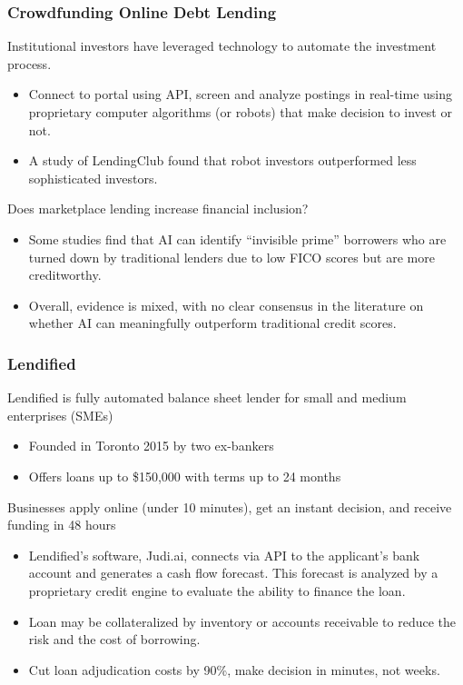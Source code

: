 \documentclass[aspectratio=169]{beamer}
\begin{document}
\begin{frame}
\frametitle{Crowdfunding Online Debt Lending}


Institutional investors have leveraged technology to automate the investment process. 
\begin{itemize}
    \item Connect to portal using API, screen and analyze postings in real-time using proprietary computer algorithms (or robots) that make decision to invest or not.
    \item A study of LendingClub found that robot investors outperformed less sophisticated investors. 
\end{itemize}

\medskip 

Does marketplace lending increase financial inclusion?
\begin{itemize}
    \item Some studies find that AI can identify “invisible prime” borrowers who are turned down by traditional lenders due to low FICO scores but are more creditworthy. 
    \item Overall, evidence is mixed, with no clear consensus in the literature on whether AI can meaningfully outperform traditional credit scores. 
\end{itemize}


\end{frame} 





\begin{frame}
\frametitle{Lendified }


Lendified is fully automated balance sheet lender for small and medium enterprises (SMEs)
\begin{itemize}
    \item Founded in Toronto 2015 by two ex-bankers
    \item Offers loans up to \$150,000 with terms up to 24 months
\end{itemize}

\medskip 


Businesses apply online (under 10 minutes), get an instant decision, and receive funding in 48 hours
\begin{itemize}
    \item Lendified’s software, Judi.ai, connects via API to the applicant’s bank account and generates a cash flow forecast. This forecast is analyzed by a proprietary credit engine to evaluate the ability to finance the loan.
    \item Loan may be collateralized by inventory or accounts receivable to reduce the risk and the cost of borrowing.
    \item Cut loan adjudication costs by 90\%, make decision in minutes, not weeks.
\end{itemize}


\end{frame} 
\end{document}
